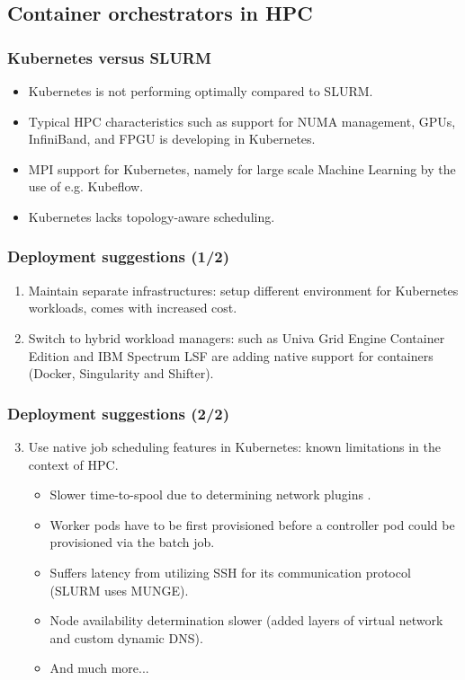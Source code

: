 \documentclass[hyperref={pdfpagelabels=false},aspectratio=169]{beamer}
\begin{document}
    \subsection{Container orchestrators in HPC}
    \begin{frame}
      \frametitle{Kubernetes versus SLURM}
      \begin{itemize}
        \item Kubernetes is not performing optimally compared to SLURM.
        \item Typical HPC characteristics such as support for NUMA management, GPUs, InfiniBand, and FPGU is developing in Kubernetes.
        \item MPI support for Kubernetes, namely for large scale Machine Learning by the use of e.g. Kubeflow.
        \item Kubernetes lacks topology-aware scheduling.
      \end{itemize}
    \end{frame}
    \begin{frame}
      \frametitle{Deployment suggestions (1/2)}
      \begin{enumerate}
        \item Maintain separate infrastructures: setup different environment for Kubernetes workloads, comes with increased cost.
        \item Switch to hybrid workload managers: such as Univa Grid Engine Container Edition and IBM Spectrum LSF are adding native support for containers (Docker, Singularity and Shifter).
      \end{enumerate}
    \end{frame}
    \begin{frame}
      \frametitle{Deployment suggestions (2/2)}
      \begin{enumerate}
      \setcounter{enumi}{2}
        \item Use native job scheduling features in Kubernetes: known limitations in the context of HPC.
        \begin{itemize}
          \item Slower time-to-spool due to determining network plugins .
          \item Worker pods have to be first provisioned before a controller pod could be provisioned via the batch job.
          \item Suffers latency from utilizing SSH for its communication protocol (SLURM uses MUNGE).
          \item Node availability determination slower (added layers of virtual network and custom dynamic DNS).
          \item And much more...
        \end{itemize}
      \end{enumerate}
    \end{frame}
\end{document}
